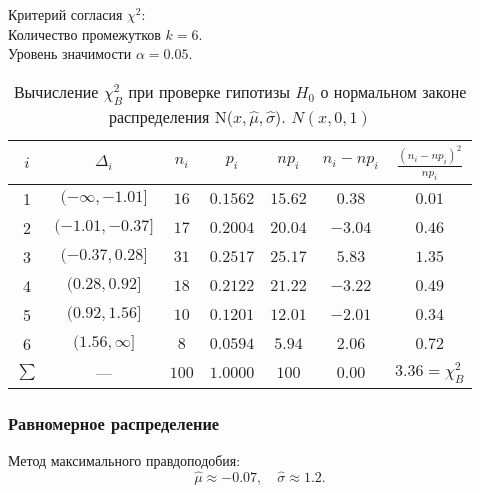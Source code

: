 \documentclass[12pt,a4paper]{article}
\begin{document}
				Критерий согласия $\chi^2$:\\
				Количество промежутков $k = 6$.\\
				Уровень значимости $\alpha = 0.05$.
				\begin{table}[H]
					\begin{center}
						\begin{tabular}{|c|c|c|c|c|c|c|}
							\hline
							$i$ & $\Delta_i$          &   $n_i$ &   $p_i$ &   $np_i$ &   $n_i-np_i$ &   $\frac{(n_i-np_i)^2}{np_i}$ \\
							\hline
							1   & $(-\infty, -1.01]$ & $16$  & $0.1562$ & $15.62$ & $0.38$  & $0.01$ \\
							2   & $(-1.01, -0.37]$   & $17$  & $0.2004$ & $20.04$ & $-3.04$ & $0.46$ \\
							3   & $(-0.37, 0.28]$    & $31$  & $0.2517$ & $25.17$ & $5.83$  & $1.35$ \\
							4   & $(0.28, 0.92]$     & $18$  & $0.2122$ & $21.22$ & $-3.22$ & $0.49$ \\
							5   & $(0.92, 1.56]$     & $10$  & $0.1201$ & $12.01$ & $-2.01$ & $0.34$ \\
							6   & $(1.56, \infty]$   & $8$   & $0.0594$ & $5.94$  & $2.06$  & $0.72$ \\
							$\sum$ & ---                & $100$ & $1.0000$ & $100$   & $0.00$  & $3.36 = \chi^2_B$ \\
							\hline
						\end{tabular}
					\end{center}
					\caption{Вычисление $\chi^2_B$ при проверке гипотизы $H_0$ о нормальном законе распределения N($x, \hat{\mu}, \hat{\sigma}$). $N(x, 0, 1)$}
				\end{table}
				
			
			\subsubsection{Равномерное распределение}
			Метод максимального правдоподобия:
			$$\hat{\mu} \approx -0.07, \quad \hat{\sigma} \approx 1.2.$$
		
\end{document}
